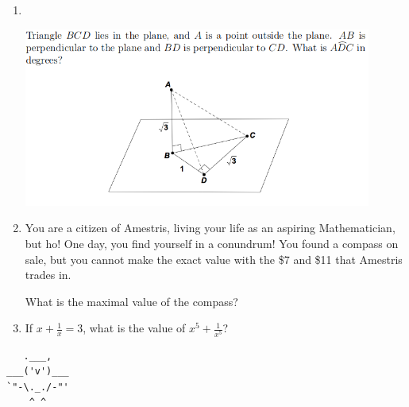 \documentclass{article}
\begin{document}
\begin{enumerate}[1.]
\item %
~
\begin{center}
    \includegraphics[width=0.9\textwidth]{test_1_question_3}
\end{center}
\vspace{6.81mm}


\item %
You are a citizen of Amestris, living your life as an aspiring Mathematician, but ho! One day, you find yourself in a conundrum! You found a compass on sale, but you cannot make the exact value with the \$7 and \$11 that Amestris trades in. 

What is the maximal value of the compass?
\vspace{6.81mm}


\item %
If $x + \frac{1}{x} = 3$, what is the value of $x^5 + \frac{1}{x^5}$?

\end{enumerate}


\vfill
\begin{center}
\begin{BVerbatim}
   .___,   
___('v')___
`"-\._./-"'
    ^ ^ 

\end{BVerbatim}
\end{center}
\end{document}
